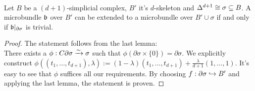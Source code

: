 \\
Let $B$ be a $(d + 1)$-simplicial complex, $B'$ it's $d$-skeleton and $\Delta^{d + 1} \cong \sigma \subseteq B$.
A microbundle $\mathfrak{b}$ over $B'$ can be extended to a microbundle over $B' \cup \sigma$ if and only if $\mathfrak{b} \vert_{\partial \sigma}$ is trivial.
\begin{proof}
The statement follows from the last lemma: \\
There exists a $\phi: C\partial \sigma \xrightarrow{\sim} \sigma$ such that $\phi(\partial \sigma \times \{0\}) = \partial \sigma$.
We explicitly construct $\phi((t_1, \dots, t_{d + 1}), \lambda) := (1 - \lambda) (t_1, \dots, t_{d + 1}) + \frac{\lambda}{d + 1} (1, \dots, 1)$.
It's easy to see that $\phi$ suffices all our requirements.
By choosing $f: \partial \sigma \hookrightarrow{} B'$ and applying the last lemma, the statement is proven.
\end{proof}